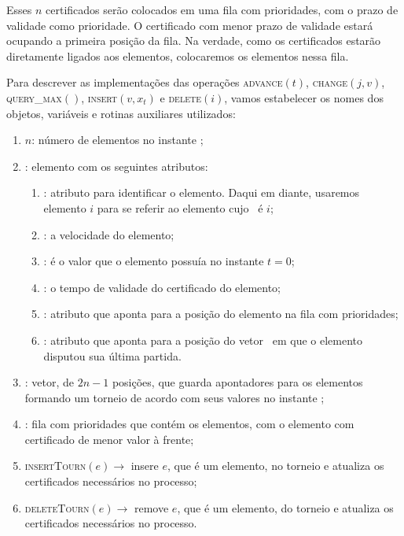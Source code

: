 Esses $n$ certificados serão colocados em uma fila com prioridades, com o prazo de validade como
prioridade.
O certificado com menor prazo de validade estará ocupando a primeira posição da fila.
Na verdade, como os certificados estarão diretamente ligados aos elementos, colocaremos os
elementos nessa fila.

Para descrever as implementações das operações \textsc{advance}$(t)$, \textsc{change}$(j, v)$,
\textsc{query\_max}$()$, \textsc{insert}$(v, x_t)$ e \textsc{delete}$(i)$, vamos estabelecer os
nomes dos objetos, variáveis e rotinas auxiliares utilizados:
\begin{enumerate}
    \item $n$: número de elementos no instante \now;
    \item \elemento: elemento com os seguintes atributos:
    \begin{enumerate}
        \item \id: atributo para identificar o elemento.
        Daqui em diante, usaremos elemento $i$ para se referir ao elemento
        cujo \id~é $i$;

        \item \speed: a velocidade do elemento;

        \item \initv: é o valor que o elemento possuía no
        instante $t = 0$;

        \item \cert: o tempo de validade do certificado do
        elemento;

        \item \pqpos: atributo que aponta para a posição do elemento
        na fila com prioridades;

        \item \lastmatch: atributo que aponta para a posição do
        vetor \torneio~em que o elemento disputou sua última
        partida.
    \end{enumerate}
    \item \torneio: vetor, de $2n - 1$ posições, que guarda
    apontadores para os elementos formando um torneio de acordo com
    seus valores no instante \now;

    \item \Q: fila com prioridades que contém os elementos, com o
    elemento com certificado de menor valor à frente;

    \item \textsc{insertTourn}$(e) \rightarrow$ insere $e$, que é um
    elemento, no torneio e atualiza os certificados necessários no
    processo;

    \item \textsc{deleteTourn}$(e) \rightarrow$ remove $e$, que é um
    elemento, do torneio e atualiza os certificados necessários no
    processo.
\end{enumerate}
